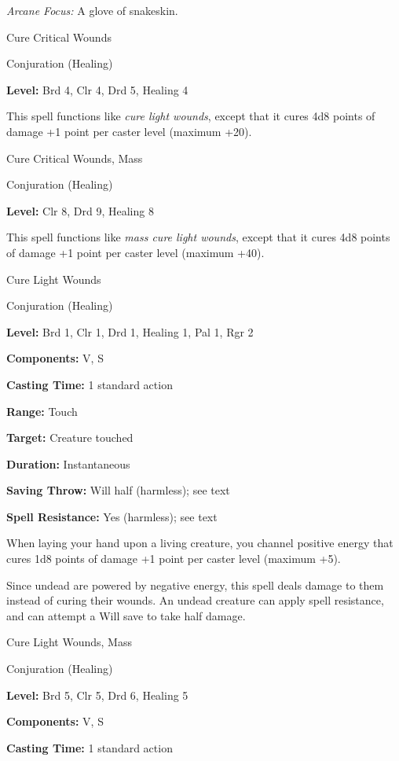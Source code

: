 \documentclass{article}
\begin{document}
\textit{Arcane Focus: }A glove of snakeskin.

\vspace{12pt}
Cure Critical Wounds

Conjuration (Healing)

\textbf{Level:} Brd 4, Clr 4, Drd 5, Healing 4

This spell functions like \textit{cure light wounds}, except that it cures 4d8 
points of damage +1 point per caster level (maximum +20).

\vspace{12pt}
Cure Critical Wounds, Mass

Conjuration (Healing)

\textbf{Level:} Clr 8, Drd 9, Healing 8

This spell functions like \textit{mass cure light wounds}, except that it cures 
4d8 points of damage +1 point per caster level (maximum +40).

\vspace{12pt}
Cure Light Wounds

Conjuration (Healing)

\textbf{Level:} Brd 1, Clr 1, Drd 1, Healing 1, Pal 1, Rgr 2

\textbf{Components:} V, S

\textbf{Casting Time:} 1 standard action

\textbf{Range:} Touch

\textbf{Target:} Creature touched

\textbf{Duration:} Instantaneous

\textbf{Saving Throw: }Will half (harmless); see text

\textbf{Spell Resistance:} Yes (harmless); see text

When laying your hand upon a living creature, you channel positive energy that 
cures 1d8 points of damage +1 point per caster level (maximum +5).

Since undead are powered by negative energy, this spell deals damage to them instead 
of curing their wounds. An undead creature can apply spell resistance, and can 
attempt a Will save to take half damage.

\vspace{12pt}
Cure Light Wounds, Mass

Conjuration (Healing)

\textbf{Level:} Brd 5, Clr 5, Drd 6, Healing 5

\textbf{Components:} V, S

\textbf{Casting Time:} 1 standard action
\end{document}
